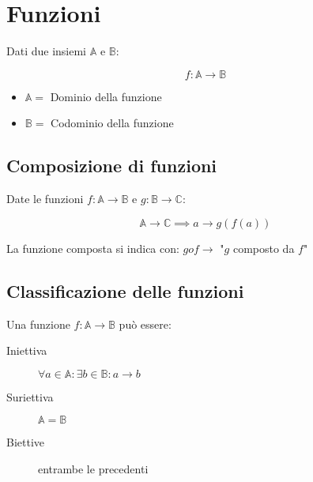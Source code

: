\documentclass{article}
\begin{document}
\section{Funzioni}

Dati due insiemi $\mathbb{A}$ e $\mathbb{B}$:

$$
f: \mathbb{A} \to \mathbb{B}
$$

\begin{itemize}
    \item $\mathbb{A} =$ Dominio della funzione
    \item $\mathbb{B} =$ Codominio della funzione
\end{itemize}

\subsection{Composizione di funzioni}

Date le funzioni $f: \mathbb{A} \to \mathbb{B}$ e $g: \mathbb{B} \to \mathbb{C}$:

$$
\mathbb{A} \to \mathbb{C} \implies a \to g(f(a))
$$

\noindent
La funzione composta si indica con: $g o f \longrightarrow$ "$g$ composto da $f$"

\subsection{Classificazione delle funzioni}

Una funzione $f: \mathbb{A} \to \mathbb{B}$ può essere:

\begin{description}
    \item[Iniettiva] $\forall a \in \mathbb{A} : \exists b \in \mathbb{B}: a \to b$
    \item[Suriettiva] $\mathbb{A} = \mathbb{B}$
    \item[Biettive] entrambe le precedenti
\end{description}
\end{document}
